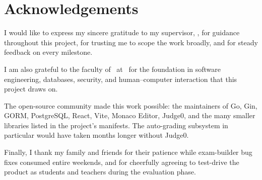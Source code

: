 \chapter*{Acknowledgements}

I would like to express my sincere gratitude to my supervisor, \bookSupervisor, for guidance throughout this project, for trusting me to scope the work broadly, and for steady feedback on every milestone.

I am also grateful to the faculty of \bookDept\ at \bookUniversity\ for the foundation in software engineering, databases, security, and human--computer interaction that this project draws on.

The open-source community made this work possible: the maintainers of Go, Gin, GORM, PostgreSQL, React, Vite, Monaco Editor, Judge0, and the many smaller libraries listed in the project's manifests. The auto-grading subsystem in particular would have taken months longer without Judge0.

Finally, I thank my family and friends for their patience while exam-builder bug fixes consumed entire weekends, and for cheerfully agreeing to test-drive the product as students and teachers during the evaluation phase.

\clearpage
